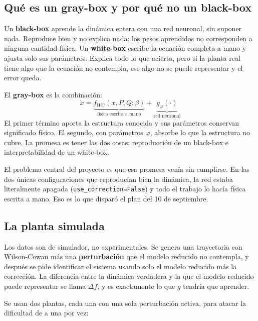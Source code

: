 \documentclass[11pt,a4paper]{article}
\newcommand{\term}[1]{\textbf{#1}}
\begin{document}
\subsection{Qué es un gray-box y por qué no un black-box}

Un \term{black-box} aprende la dinámica entera con una red neuronal, sin
suponer nada. Reproduce bien y no explica nada: los pesos aprendidos no
corresponden a ninguna cantidad física. Un \term{white-box} escribe la ecuación
completa a mano y ajusta solo sus parámetros. Explica todo lo que acierta, pero
si la planta real tiene algo que la ecuación no contempla, ese algo no se puede
representar y el error queda.

El \term{gray-box} es la combinación:
\begin{equation}
  \dot{x} = \underbrace{f_{WC}(x, P, Q; \beta)}_{\text{física escrita a mano}}
          + \underbrace{g_\varphi(\cdot)}_{\text{red neuronal}}
\end{equation}
El primer término aporta la estructura conocida y sus parámetros conservan
significado físico. El segundo, con parámetros $\varphi$, absorbe lo que la
estructura no cubre. La promesa es tener las dos cosas: reproducción de un
black-box e interpretabilidad de un white-box.

El problema central del proyecto es que esa promesa venía sin cumplirse. En las
dos únicas configuraciones que reproducían bien la dinámica, la red estaba
literalmente apagada (\texttt{use\_correction=False}) y todo el trabajo lo hacía
física escrita a mano. Eso es lo que disparó el plan del 10 de septiembre.

\subsection{La planta simulada}

Los datos son de simulador, no experimentales. Se genera una trayectoria con
Wilson-Cowan más una \term{perturbación} que el modelo reducido no contempla, y
después se pide identificar el sistema usando solo el modelo reducido más la
corrección. La diferencia entre la dinámica verdadera y la que el modelo
reducido puede representar se llama $\Delta f$, y es exactamente lo que $g$
tendría que aprender.

Se usan dos plantas, cada una con una sola perturbación activa, para atacar la
dificultad de a una por vez:
\end{document}
